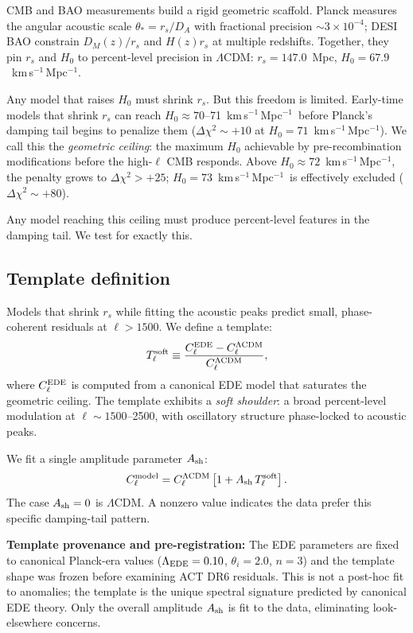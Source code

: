 \documentclass[onecolumn,showpacs,preprintnumbers,amsmath,amssymb,prd]{revtex4-2}
\newcommand{\lcdm}{$\Lambda$CDM}
\newcommand{\kms}{km\,s$^{-1}$\,Mpc$^{-1}$}
\begin{document}
CMB and BAO measurements build a rigid geometric scaffold. Planck measures 
the angular acoustic scale $\theta_* = r_s/D_A$ with fractional precision 
$\sim 3 \times 10^{-4}$; DESI BAO constrain $D_M(z)/r_s$ and $H(z) r_s$ at 
multiple redshifts. Together, they pin $r_s$ and $H_0$ to percent-level 
precision in \lcdm: $r_s = 147.0$~Mpc, $H_0 = 67.9$~\kms.

Any model that raises $H_0$ must shrink $r_s$. But this freedom is limited. 
Early-time models that shrink $r_s$ can reach $H_0 \approx 70$--71~\kms\ before 
Planck's damping tail begins to penalize them ($\Delta\chi^2 \sim +10$ at 
$H_0 = 71$~\kms). We call this the \emph{geometric ceiling}: the maximum $H_0$ 
achievable by pre-recombination modifications before the high-$\ell$ CMB 
responds. Above $H_0 \approx 72$~\kms, the penalty grows to $\Delta\chi^2 > +25$; 
$H_0 = 73$~\kms\ is effectively excluded ($\Delta\chi^2 \sim +80$).

Any model reaching this ceiling must produce percent-level features in the 
damping tail. We test for exactly this.

\subsection{Template definition}
\label{subsec:template}

Models that shrink $r_s$ while fitting the acoustic peaks predict small, 
phase-coherent residuals at $\ell > 1500$. We define a template:
\begin{equation}
    T_\ell^{\rm soft} \equiv \frac{C_\ell^{\rm EDE} - C_\ell^{\rm \Lambda CDM}}{C_\ell^{\rm \Lambda CDM}},
    \label{eq:template}
\end{equation}
where $C_\ell^{\rm EDE}$ is computed from a canonical EDE model \cite{Poulin2019} 
that saturates the geometric ceiling. The template exhibits a \emph{soft shoulder}: 
a broad percent-level modulation at $\ell \sim 1500$--2500, with oscillatory 
structure phase-locked to acoustic peaks.

We fit a single amplitude parameter $A_{\rm sh}$:
\begin{equation}
    C_\ell^{\rm model} = C_\ell^{\rm \Lambda CDM} \left[ 1 + A_{\rm sh}\, T_\ell^{\rm soft} \right].
    \label{eq:ash}
\end{equation}
The case $A_{\rm sh} = 0$ is \lcdm. A nonzero value indicates the data prefer 
this specific damping-tail pattern.

\textbf{Template provenance and pre-registration:} The EDE parameters are fixed to canonical 
Planck-era values ($\Lambda_{\rm EDE} = 0.10$, $\theta_i = 2.0$, $n = 3$) 
and the template shape was frozen before examining ACT DR6 residuals. 
This is not a post-hoc fit to anomalies; the template is the unique spectral 
signature predicted by canonical EDE theory. Only the overall amplitude 
$A_{\rm sh}$ is fit to the data, eliminating look-elsewhere concerns.
\end{document}
